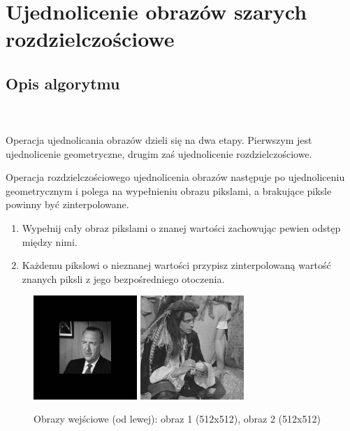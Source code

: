 \documentclass[final,a4paper,openany,12pt]{mwbk}
\begin{document}
\section{Ujednolicenie obrazów szarych rozdzielczościowe}
\subsection*{Opis algorytmu}
\hfill
\\\\
\indent 
Operacja ujednolicania obrazów dzieli się na dwa etapy. Pierwszym jest ujednolicenie geometryczne, drugim zaś ujednolicenie rozdzielczościowe.

Operacja rozdzielczościowego ujednolicenia obrazów następuje po ujednoliceniu geometrycznym i polega na wypełnieniu obrazu pikslami, a brakujące piksle powinny być zinterpolowane.
\begin{enumerate}
	\item Wypełnij cały obraz pikslami o znanej wartości zachowując pewien odstęp między nimi.
	\item Każdemu pikslowi o nieznanej wartości przypisz zinterpolowaną wartość znanych piksli z jego bezpośredniego otoczenia.
\end{enumerate}

\begin{figure}[H]
	\begin{center}
		\includegraphics[width=0.35\textwidth]{gentelman_gray_unificationGeo_result}
		\includegraphics[width=0.35\textwidth]{pirate_gray_unificationGeo_result}
	\end{center}
	\caption{Obrazy wejściowe (od lewej): obraz 1 (512x512), obraz 2 (512x512)}
\end{figure}
\end{document}
